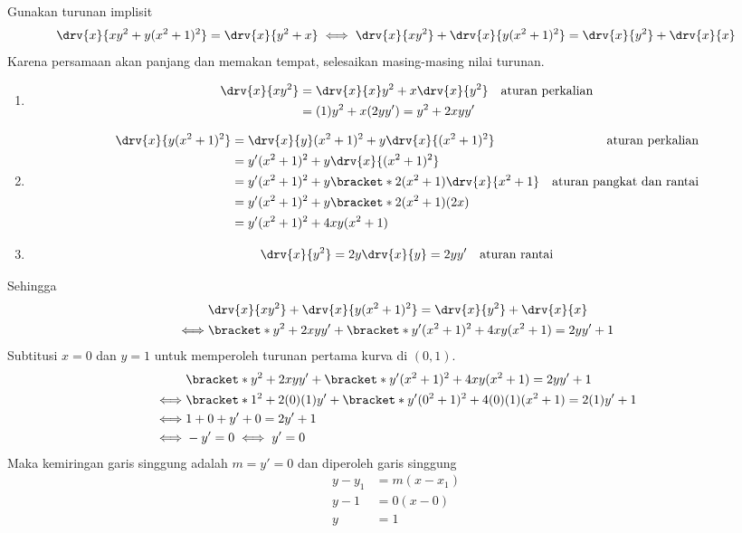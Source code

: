 \begin{enumerate}[leftmargin=*, label={\arabic*}.]
\begin{enumerate}[label={\alph*}.]
    Gunakan turunan implisit
    \begin{align*}
        \drv{x}{xy^{2}+y(x^{2}+1)^{2}} = \drv{x}{y^{2}+x} \iff 
        \drv{x}{xy^{2}} + \drv{x}{y(x^{2}+1)^{2}} = \drv{x}{y^{2}} + \drv{x}{x}
    \end{align*}
    Karena persamaan akan panjang dan memakan tempat, selesaikan masing-masing nilai 
    turunan.
    \begin{enumerate}[label={\arabic*})]
        \item 
        \begin{align*}
            \drv{x}{xy^{2}} 
            &= \drv{x}{x}y^{2}+x\drv{x}{y^{2}}
            &\text{aturan perkalian}\\
            &= (1)y^{2} + x(2yy') = y^{2} + 2xyy'
        \end{align*}
        \item 
        \begin{align*}
            \drv{x}{y(x^{2}+1)^{2}} 
            &= \drv{x}{y}(x^{2}+1)^{2}+y\drv{x}{(x^{2}+1)^{2}}
            &\text{aturan perkalian}\\
            &= y'(x^{2}+1)^{2} + y\drv{x}{(x^{2}+1)^{2}}\\
            &=y'(x^{2}+1)^{2} + y\bracket*{2(x^{2}+1)\drv{x}{x^{2}+1}}
            &\text{aturan pangkat dan rantai}\\
            &=y'(x^{2}+1)^{2} + y\bracket*{2(x^{2}+1)(2x)}\\
            &=y'(x^{2}+1)^{2} + 4xy(x^{2}+1)
        \end{align*}
        \item 
        \[
            \drv{x}{y^{2}} = 2y\drv{x}{y} = 2yy' \quad \text{aturan rantai}
        \]
    \end{enumerate}
    Sehingga 
    \begin{align*}
        &\drv{x}{xy^{2}} + \drv{x}{y(x^{2}+1)^{2}} = \drv{x}{y^{2}} + \drv{x}{x} \\
        \iff &\bracket*{y^{2} + 2xyy'} + \bracket*{y'(x^{2}+1)^{2} 
        + 4xy(x^{2}+1)}= 2yy' + 1\\
    \end{align*}
    Subtitusi $x = 0$ dan $y=1$ untuk memperoleh turunan pertama kurva di $(0,1)$.
    \begin{align*}
        &\bracket*{y^{2} + 2xyy'} + \bracket*{y'(x^{2}+1)^{2} 
        + 4xy(x^{2}+1)}= 2yy' + 1\\
        \iff &\bracket*{1^{2} + 2(0)(1)y'} + \bracket*{y'(0^{2}+1)^{2} 
        + 4(0)(1)(x^{2}+1)}= 2(1)
        y' + 1\\
        \iff &1+0+y'+0 = 2y'+1\\
        \iff &-y' = 0 \iff y' = 0
    \end{align*}
    Maka kemiringan garis singgung adalah $m = y' = 0$ dan diperoleh garis singgung
    \begin{align*}
        y-y_1 &= m(x-x_1)\\
        y-1 &= 0(x-0)\\
        y &= 1
    \end{align*}


\end{enumerate}
\end{enumerate}
